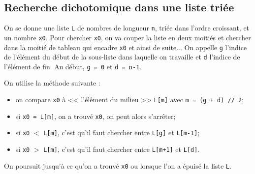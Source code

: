 %
%
%


\subsection*{Recherche dichotomique dans une liste triée}
\ifprof
\else
On se donne une liste \lstinline{L} de nombres de longueur \lstinline{n}, {triée dans l'ordre croissant}, et un nombre \lstinline{x0}. 
Pour chercher \lstinline{x0}, on va couper la liste en deux moitiés et chercher dans la moitié de tableau qui encadre \lstinline{x0} et ainsi de suite...
On appelle \lstinline{g} l'indice de l'élément du début de la sous-liste dans laquelle on travaille et \lstinline{d} l'indice de l'élément de fin.
Au début, \lstinline{g = 0} et \lstinline{d = n-1}.

%

On utilise la méthode suivante :
\begin{itemize}
\item on compare \lstinline{x0} à << l'élément du milieu >>  \lstinline{L[m]} avec \lstinline{m = (g + d) // 2};
\item si \lstinline{x0 = L[m]}, on a trouvé \lstinline{x0}, on peut alors s'arrêter;
\item si \lstinline{x0} $<$ \lstinline{L[m]}, c'est qu'il faut chercher entre \lstinline{L[g]} et  \lstinline{L[m-1]};%
\item si \lstinline{x0} $>$ \lstinline{L[m]}, c'est qu'il faut chercher  entre \lstinline{L[m+1]} et \lstinline{L[d]}.%
\end{itemize}

On poursuit jusqu'à ce qu'on a trouvé \lstinline{x0} ou lorsque l'on a épuisé la liste \lstinline{L}.

